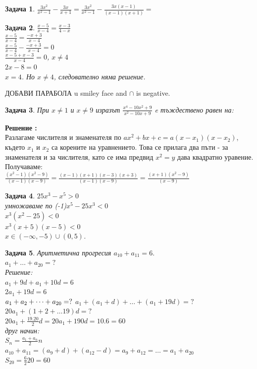 \documentclass{article}
\newtheorem{problem}{Задача}
\newcounter{solution}
\newcommand\solution{%
	\stepcounter{solution}%
	\textbf{Решение :}\\%
}
\begin{document}
\begin{problem}
	$\frac{3x^2	}{x^2-1} - \frac{3x}{x+1} = \frac{3x^2	}{x^2-1} -\frac{3x(x-1)	}{(x-1)(x+1)} = $
\end{problem}



\begin{problem}
	$\frac{x-5}{x-4} = \frac{x-3}{4-x}$ \\	
	$\frac{x-5}{x-4} = \frac{-x+3}{x-4}$\\	
	$\frac{x-5}{x-4} - \frac{-x+3}{x-4} = 0$\\	
	$\frac{x-5 +x-3}{x-4}  = 0$, $x \neq 4 $ \\
	$2x - 8 = 0 $ \\
	$ x  = 4$. Но  $x \neq 4 $, следователно няма решение.
\end{problem}

ДОБАВИ ПАРАБОЛА u smiley face and $\cap$ is negative.  




\begin{problem}
	При $x \neq 1 $ и $x \neq 9 $ изразът $ \frac{x^4-10x^2 + 9  }{x^2-10x + 9}$  e тъждествено равен на:
\end{problem}
\solution Разлагаме числителя и знаменателя по $ax^2 + bx + c = a(x-x_1)(x-x_2) $, където $x_1$ и $x_2$ са корените на уравнението. Това се прилага два пъти - за знаменателя и за числителя, като се има предвид $x^2 = y $ дава квадратно уравение.
Получаваме: \\
$\frac{(x^2-1)(x^2-9)}{(x-1)(x-9)} = \frac{(x-1)(x+1)(x-3)(x+3)}{(x-1)(x-9) } = \frac{(x+1)(x^2 - 9 )}{(x-9) } $

\begin{problem}
	$25x^3 - x^5 > 0$\\
	умножаваме по (-1)$ x^5 - 25x^3 < 0 $ \\
	$x^3(x^2-25)<0 $ \\
	$x^3(x+5)(x-5) < 0 $\\
	$ x \in  (-\infty, -5 ) \cup (0,5)$.
	
	
\end{problem}

\begin{problem}
Аритметична прогресия $a_{10} + a_{11} = 6.  $\\
$a_1 + \dots + a_{20} = ? $ \\
Решение: \\
$a_1 + 9d + a_1 + 10d = 6 $ \\
$2a_1 + 19d = 6 $\\
$a_1 + a_2 + \dots + a_{20} = ? \\ $
$a_1 + (a_1 +d) + \dots + (a_{1} + 19d) = ? $\\
$20a_1 + (1 + 2 + \dots 19)d = ?  $ \\
$20a_1 + \frac{19.20}{2}d = 20a_1 + 190d = 10.6 = 60 $ \\

друг начин:\\
$S_n = \frac{a_1 + a_n}{2}n $ \\
$a_{10} + a_{11} = (a_9 + d) + (a_{12} - d) = a_9 + a_{12 }= \dots = a_1 + a_{20} $ \\
$S_{20} = \frac{6}{2}20 = 60 $ 
\end{problem}
\end{document}
